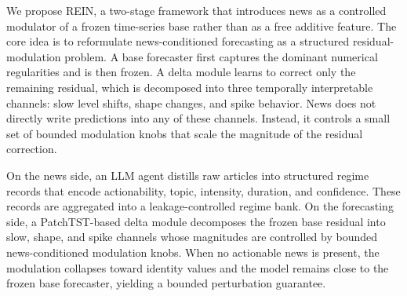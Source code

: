 \documentclass{article}
\newcommand{\method}{REIN\xspace}
\begin{document}
We propose \method, a two-stage framework that introduces news as a controlled modulator of a frozen time-series base rather than as a free additive feature. The core idea is to reformulate news-conditioned forecasting as a structured residual-modulation problem. A base forecaster first captures the dominant numerical regularities and is then frozen. A delta module learns to correct only the remaining residual, which is decomposed into three temporally interpretable channels: slow level shifts, shape changes, and spike behavior. News does not directly write predictions into any of these channels. Instead, it controls a small set of bounded modulation knobs that scale the magnitude of the residual correction.

On the news side, an LLM agent distills raw articles into structured regime records that encode actionability, topic, intensity, duration, and confidence. These records are aggregated into a leakage-controlled regime bank. On the forecasting side, a PatchTST-based delta module decomposes the frozen base residual into slow, shape, and spike channels whose magnitudes are controlled by bounded news-conditioned modulation knobs. When no actionable news is present, the modulation collapses toward identity values and the model remains close to the frozen base forecaster, yielding a bounded perturbation guarantee.
\end{document}
